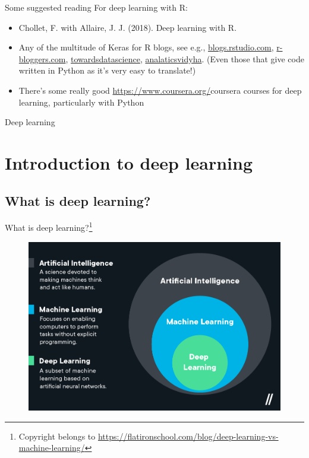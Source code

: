 \documentclass{beamer}
\begin{document}
\begin{frame}{Some suggested reading}
For deep learning with R:
\begin{itemize}
\item Chollet, F. with Allaire, J. J. (2018). Deep learning with R.
\item Any of the multitude of Keras for R blogs, see e.g., \href{https://blogs.rstudio.com/ai/posts/2019-11-27-gettingstarted-2020/}{blogs.rstudio.com}, \href{https://www.r-bloggers.com/2021/12/using-keras-for-deep-learning-with-r/}{r-bloggers.com}, \href{https://towardsdatascience.com/r-vs-python-image-classification-with-keras-1fa99a8fef9b}{towardsdatascience}, \href{https://www.analyticsvidhya.com/blog/2017/06/getting-started-with-deep-learning-using-keras-in-r/}{analaticsvidyha}. (Even those that give code written in Python as it's very easy to translate!)
\item There's some really good \url{https://www.coursera.org/}{coursera} courses for deep learning, particularly with Python
\end{itemize}
\end{frame}




\begin{frame}
\begin{center}
\Huge Deep learning
\end{center}
\end{frame}
\section{Introduction to deep learning}
\subsection{What is deep learning?}
\begin{frame}{What is deep learning?\footnote{Copyright belongs to \url{https://flatironschool.com/blog/deep-learning-vs-machine-learning/}}}
\begin{figure}
\includegraphics[width=0.75\linewidth]{Images/AI.png}
\end{figure}
\end{frame}
\end{document}
